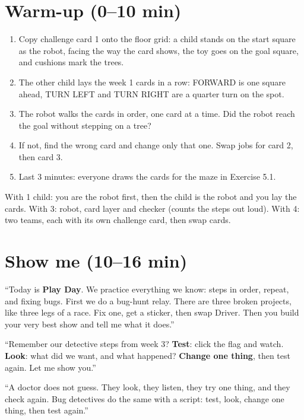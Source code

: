 \section{Warm-up (0--10 min)}
\begin{unplugged}
\begin{enumerate}[leftmargin=1.4em,itemsep=1pt]
  \item Copy challenge card 1 onto the floor grid: a child stands on the start square as the robot, facing the way the card shows, the toy goes on the goal square, and cushions mark the trees.
  \item The other child lays the week 1 cards in a row: FORWARD is one square ahead, TURN LEFT and TURN RIGHT are a quarter turn on the spot.
  \item The robot walks the cards in order, one card at a time. Did the robot reach the goal without stepping on a tree?
  \item If not, find the wrong card and change only that one. Swap jobs for card 2, then card 3.
  \item Last 3 minutes: everyone draws the cards for the maze in Exercise 5.1.
\end{enumerate}
With 1 child: you are the robot first, then the child is the robot and you lay the cards. With 3: robot, card layer and checker (counts the steps out loud). With 4: two teams, each with its own challenge card, then swap cards.
\end{unplugged}

\section{Show me (10--16 min)}
\begin{teacherscript}
\enquote{Today is \textbf{Play Day}. We practice everything we know: steps in order, repeat, and fixing bugs. First we do a bug-hunt relay. There are three broken projects, like three legs of a race. Fix one, get a sticker, then swap Driver. Then you build your very best show and tell me what it does.}

\enquote{Remember our detective steps from week 3? \textbf{Test}: click the flag and watch. \textbf{Look}: what did we want, and what happened? \textbf{Change one thing}, then test again. Let me show you.}
\end{teacherscript}

\begin{analogy}
\enquote{A doctor does not guess. They look, they listen, they try one thing, and they check again. Bug detectives do the same with a script: test, look, change one thing, then test again.}
\end{analogy}

